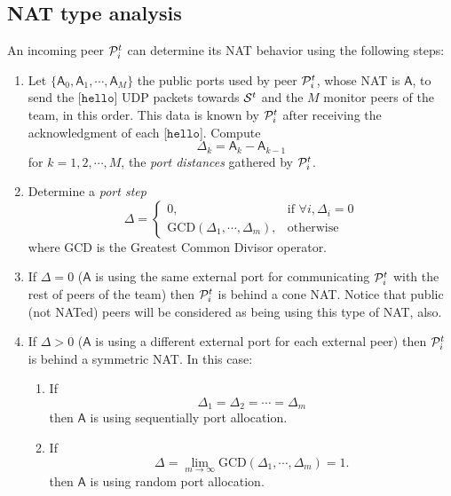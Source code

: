 \subsection{NAT type analysis}
An incoming peer ${\cal P}^t_i$ can determine its NAT behavior using
the following steps:
\begin{enumerate}
\item Let $\{\mathsf{A}_0, \mathsf{A}_1, \cdots, \mathsf{A}_M\}$ the
  public ports used by peer ${\cal P}^t_i$, whose NAT is $\mathsf{A}$,
  to send the [$\mathtt{hello}$] UDP packets towards ${\cal S}^t$ and
  the $M$ monitor peers of the team, in this order. This data is known
  by ${\cal P}^t_i$ after receiving the acknowledgment of each
  [$\mathtt{hello}$]. Compute
  \begin{equation}
    \Delta_k = \mathsf{A}_k - \mathsf{A}_{k-1}
    \label{eq:port_distancies}
  \end{equation}
  for $k=1,2,\cdots,M$, the \emph{port distances} gathered by ${\cal
    P}^t_i$.
\item Determine a \emph{port step}
  \begin{equation}
    \Delta = \left\{\begin{array}{lr}
    0, & \text{if } \forall i, \Delta_i = 0 \\
    \mathrm{GCD}(\Delta_1, \cdots, \Delta_m), & \text{otherwise}
    \end{array}\right.
    \label{eq:port_step}
  \end{equation}
  where GCD is the Greatest Common Divisor operator.
\item If $\Delta=0$ ($\mathsf{A}$ is using the same external port for
  communicating ${\cal P}^t_i$ with the rest of peers of the team)
  then ${\cal P}^t_i$ is behind a cone NAT. Notice that public (not
  NATed) peers will be considered as being using this type of NAT,
  also.
\item If $\Delta>0$ ($\mathsf{A}$ is using a different external port
  for each external peer) then ${\cal P}^t_i$ is behind a symmetric
  NAT. In this case:
  \begin{enumerate}
  \item If
    \begin{equation}
      \Delta_1 = \Delta_2 = \cdots = \Delta_m
    \end{equation}
    then $\mathsf{A}$ is using sequentially port allocation.
  \item If
    \begin{equation}
      \Delta = \lim_{m\to\infty} \mathrm{GCD}(\Delta_1, \cdots, \Delta_m) = 1.
    \end{equation}
    then $\mathsf{A}$ is using random port allocation.
  \end{enumerate}
\end{enumerate}

